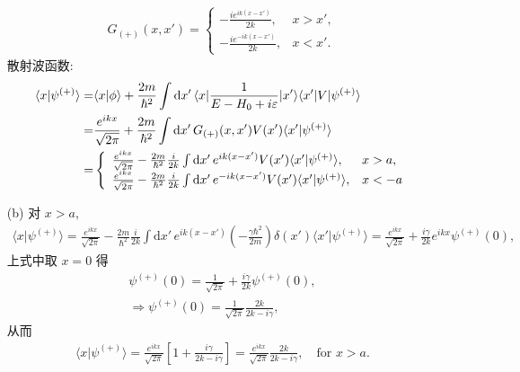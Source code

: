 \documentclass{assignment}
\begin{document}
\begin{sol}
\begin{itemize}
        \begin{align}
            G_{(+)}(x,x')=\left\{\begin{array}{ll}
                -\frac{ie^{ik(x-x')}}{2k},&x>x',\\
                -\frac{ie^{-ik(x-x')}}{2k},&x<x'.
            \end{array}\right.
        \end{align}
        散射波函数:
        \begin{align}
            \notag\langle x\vert\psi^{(+)}\rangle=&\langle x\vert\phi\rangle+\frac{2m}{\hbar^2}\int\mathrm{d}x'\,\langle x\rvert\frac{1}{E-H_0+i\varepsilon}\lvert x'\rangle\langle x'\rvert V\lvert\psi^{(+)}\rangle\\
            \notag=&\frac{e^{ikx}}{\sqrt{2\pi}}+\frac{2m}{\hbar^2}\int\mathrm{d}x'\,G_{(+)}(x,x')V(x')\langle x'\vert\psi^{(+)}\rangle\\
            =&\left\{\begin{array}{ll}
                \frac{e^{ikx}}{\sqrt{2\pi}}-\frac{2m}{\hbar^2}\frac{i}{2k}\int\mathrm{d}x'\,e^{ik(x-x')}V(x')\langle x'\vert\psi^{(+)}\rangle,&x>a,\\
                \frac{e^{ikx}}{\sqrt{2\pi}}-\frac{2m}{\hbar^2}\frac{i}{2k}\int\mathrm{d}x'\,e^{-ik(x-x')}V(x')\langle x'\vert\psi^{(+)}\rangle,&x<-a
            \end{array}\right.
        \end{align}
        \item[(b)] 对 $x>a$,
        \begin{align}
            \langle x\vert\psi^{(+)}\rangle=\frac{e^{ikx}}{\sqrt{2\pi}}-\frac{2m}{\hbar^2}\frac{i}{2k}\int\mathrm{d}x'\,e^{ik(x-x')}\left(-\frac{\gamma\hbar^2}{2m}\right)\delta(x')\langle x'\vert\psi^{(+)}\rangle=\frac{e^{ikx}}{\sqrt{2\pi}}+\frac{i\gamma}{2k}e^{ikx}\psi^{(+)}(0),
        \end{align}
        上式中取 $x=0$ 得
        \begin{gather}
            \psi^{(+)}(0)=\frac{1}{\sqrt{2\pi}}+\frac{i\gamma}{2k}\psi^{(+)}(0),\\
            \Longrightarrow\psi^{(+)}(0)=\frac{1}{\sqrt{2\pi}}\frac{2k}{2k-i\gamma},
        \end{gather}
        从而
        \begin{align}
            \langle x\vert\psi^{(+)}\rangle=\frac{e^{ikx}}{\sqrt{2\pi}}\left[1+\frac{i\gamma}{2k-i\gamma}\right]=\frac{e^{ikx}}{\sqrt{2\pi}}\frac{2k}{2k-i\gamma},\quad\text{for }x>a.
        \end{align}

\end{itemize}
\end{sol}
\end{document}
